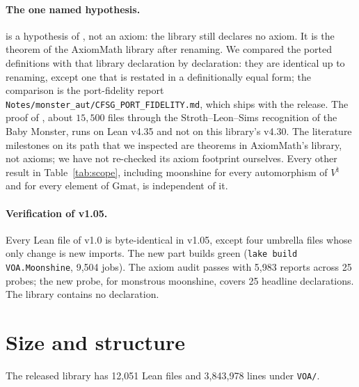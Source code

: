 \documentclass[10pt]{article}
\begin{document}
\paragraph{The one named hypothesis.}  is a hypothesis of , not an axiom:
the library still declares no axiom. It is the theorem  of the AxiomMath library
\cite{AxiomCFSG} after renaming. We compared the ported definitions with that library declaration by declaration: they
are identical up to renaming, except one that is restated in a definitionally equal form; the comparison is the
port-fidelity report \texttt{Notes/monster\_aut/CFSG\_PORT\_FIDELITY.md}, which ships with the release. The proof of
, about $15{,}500$ files through the Stroth--Leon--Sims recognition of the Baby Monster, runs on
Lean v4.35 and not on this library's v4.30. The literature milestones on its path that we inspected are theorems in
AxiomMath's library, not axioms; we have not re-checked its axiom footprint ourselves. Every other result in
Table~\ref{tab:scope}, including moonshine for every automorphism of $V^\natural$ and for every element of
$\mathrm{Gmat}$, is independent of it.

\paragraph{Verification of v1.05.} Every Lean file of v1.0 is byte-identical in v1.05, except four umbrella files
whose only change is new imports. The new part builds green (\texttt{lake build VOA.Moonshine}, 9{,}504 jobs). The
axiom audit passes with 5{,}983 reports across 25 probes; the new probe, for monstrous moonshine, covers 25 headline
declarations. The library contains no  declaration.

\section{Size and structure}

The released library has 12{,}051 Lean files and 3{,}843{,}978 lines under \texttt{VOA/}.
\end{document}
